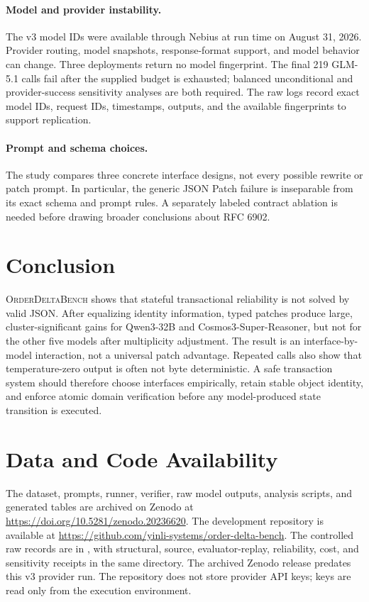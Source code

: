 \documentclass[11pt]{article}
\newcommand{\orderdelta}{\textsc{OrderDeltaBench}}
\begin{document}
\paragraph{Model and provider instability.}
The v3 model IDs were available through Nebius at run time on August 31, 2026.
Provider routing, model snapshots, response-format support, and model behavior
can change. Three deployments return no model fingerprint. The final 219
GLM-5.1 calls fail after the supplied budget is exhausted; balanced
unconditional and provider-success sensitivity analyses are both required.
The raw logs record exact model IDs, request IDs, timestamps, outputs, and the
available fingerprints to support replication.

\paragraph{Prompt and schema choices.}
The study compares three concrete interface designs, not every possible rewrite
or patch prompt. In particular, the generic JSON Patch failure is inseparable
from its exact schema and prompt rules. A separately labeled contract ablation
is needed before drawing broader conclusions about RFC 6902.

\section{Conclusion}
\orderdelta{} shows that stateful transactional reliability is not solved by
valid JSON. After equalizing identity information, typed patches produce large,
cluster-significant gains for Qwen3-32B and Cosmos3-Super-Reasoner, but not for
the other five models after multiplicity adjustment. The result is an
interface-by-model interaction, not a universal patch advantage. Repeated calls
also show that temperature-zero output is often not byte deterministic. A safe
transaction system should therefore choose interfaces empirically, retain
stable object identity, and enforce atomic domain verification before any
model-produced state transition is executed.

\section*{Data and Code Availability}
The dataset, prompts, runner, verifier, raw model outputs, analysis scripts,
and generated tables are archived on Zenodo
\cite{li2026orderdeltaartifact} at
\url{https://doi.org/10.5281/zenodo.20236620}. The development repository is
available at
\url{https://github.com/yinli-systems/order-delta-bench}. The controlled raw
records are in , with structural,
source, evaluator-replay, reliability, cost, and sensitivity receipts in the
same directory. The archived Zenodo release predates this v3 provider run. The
repository does not store provider API keys; keys are read only from the
execution environment.
\end{document}
